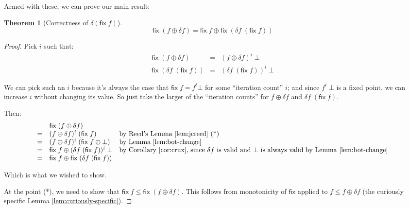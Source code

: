 \documentclass{article}
\newcommand{\ms}[1]{\ensuremath{\mathsf{#1}}}
\newtheorem{theorem}{Theorem}
\theoremstyle{definition}
\newcommand{\fix}{\ms{fix}}
\newcommand{\dv}{\delta}
\begin{document}
Armed with these, we can prove our main result:

\begin{theorem}[Correctness of $\dv(\fix\;f)$]
  \[ \fix\;(f \oplus \dv f) = \fix\;f \oplus \fix\;(\dv f\; (\fix\;f)) \]
\end{theorem}

\begin{proof}
  Pick $i$ such that:
  \begin{eqnarray*}
    \fix\;(f \oplus \delta f) &=& (f \oplus \dv f)^i \;\bot\\
    \fix\;(\dv f \;(\fix\;f)) &=& (\dv f\;(\fix\;f))^i \;\bot
  \end{eqnarray*}

  We can pick such an $i$ because it's always the case that $\fix\;f = f^i \bot$
  for some ``iteration count'' $i$; and since $f^i\;\bot$ is a fixed point, we
  can increase $i$ without changing its value. So just take the larger of the
  ``iteration counts'' for $f \oplus \dv f$ and $\dv f\;(\fix\;f)$.

  Then:
  \[
  \begin{array}{cll}
     & \fix\;(f \oplus \dv f)\\
    =& (f \oplus \dv f)^i \; (\fix\;f)
    & \text{by Reed's Lemma \ref{lem:jcreed} (*)}\\
    =& (f \oplus \dv f)^i \; (\fix\;f \oplus \bot)
    & \text{by Lemma \ref{lem:bot-change}}\\
    =& \fix\;f \oplus (\dv f \;(\fix\;f))^i \;\bot
    & \text{by Corollary \ref{cor:crux}, since $\dv f$ is valid and $\bot$ is always valid by Lemma \ref{lem:bot-change}}\\
    =& \fix\;f \oplus \fix\;(\dv f\;(\fix\;f))
  \end{array}
  \]

  Which is what we wished to show.

  At the point (*), we need to show that $\fix\; f \le \fix\; (f \oplus \dv f)$.
  This follows from monotonicity of $\fix$ applied to $f \le f \oplus \dv f$
  (the curiously specific Lemma \ref{lem:curiously-specific}).

\end{proof}
\end{document}
